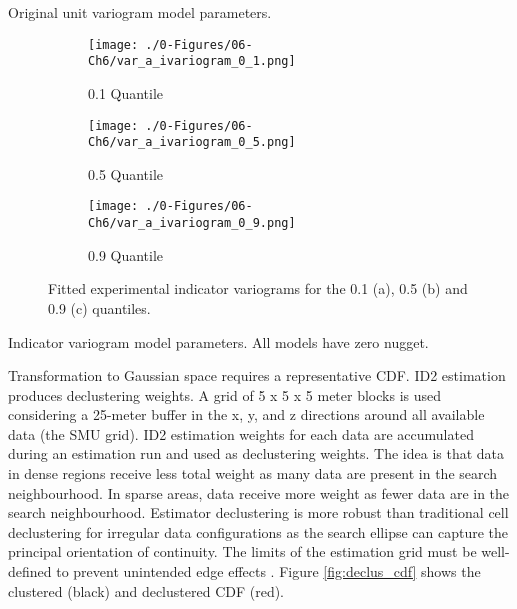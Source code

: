 \begin{table}[!htb]
    \centering
    \caption{Original unit variogram model parameters.}
    \resizebox{1\width}{!}{}
    \label{tab:orig_expvar}
\end{table}

\begin{figure}
    \begin{subfigure}{1.0\textwidth}
        \centering
        \texttt{[image: ./0-Figures/06-Ch6/var\_a\_ivariogram\_0\_1.png]}
        \caption{0.1 Quantile}
    \end{subfigure}
    \begin{subfigure}{1.0\textwidth}
        \centering
        \texttt{[image: ./0-Figures/06-Ch6/var\_a\_ivariogram\_0\_5.png]}
        \caption{0.5 Quantile}
    \end{subfigure}
    \begin{subfigure}{1.0\textwidth}
        \centering
        \texttt{[image: ./0-Figures/06-Ch6/var\_a\_ivariogram\_0\_9.png]}
        \caption{0.9 Quantile}
    \end{subfigure}
    \caption{Fitted experimental indicator variograms for the 0.1 (a), 0.5 (b) and 0.9 (c) quantiles.}
    \label{fig:ind_expvar}
\end{figure}

\begin{table}[!htb]
    \centering
    \caption{Indicator variogram model parameters. All models have zero nugget.}
    \resizebox{0.9\width}{!}{}
    \label{tab:ind_expvar}
\end{table}

Transformation to Gaussian space requires a representative \gls{CDF}.  \Gls{ID2} estimation produces declustering weights. A grid of 5 x 5 x 5 meter blocks is used considering a 25-meter buffer in the x, y, and z directions around all available data (the \gls{SMU} grid). \Gls{ID2} estimation weights for each data are accumulated during an estimation run and used as declustering weights. The idea is that data in dense regions receive less total weight as many data are present in the search neighbourhood. In sparse areas, data receive more weight as fewer data are in the search neighbourhood. Estimator declustering is more robust than traditional cell declustering for irregular data configurations as the search ellipse can capture the principal orientation of continuity. The limits of the estimation grid must be well-defined to prevent unintended edge effects \cite{Wilde2007}. Figure \ref{fig:declus_cdf} shows the clustered (black) and declustered \gls{CDF} (red).

